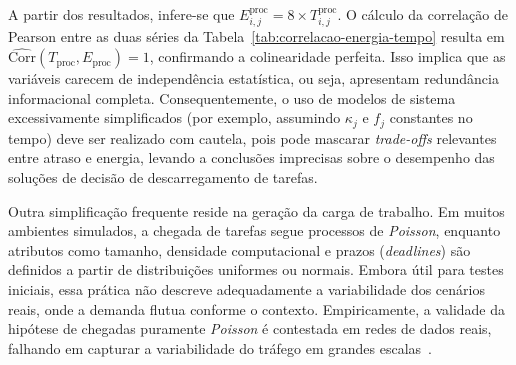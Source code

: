 \begin{figure}[ht!]
    \centering
\end{figure}

A partir dos resultados, infere-se que $E_{i,j}^{\text{proc}} = 8 \times T_{i,j}^{\text{proc}}$. O cálculo da correlação de Pearson entre as duas séries da Tabela~\ref{tab:correlacao-energia-tempo} resulta em $\widehat{\mathrm{Corr}}(T_{\text{proc}}, E_{\text{proc}})=1$, confirmando a colinearidade perfeita. Isso implica que as variáveis carecem de independência estatística, ou seja, apresentam redundância informacional completa. Consequentemente, o uso de modelos de sistema excessivamente simplificados (por exemplo, assumindo $\kappa_j$ e $f_j$ constantes no tempo) deve ser realizado com cautela, pois pode mascarar \textit{trade-offs} relevantes entre atraso e energia, levando a conclusões imprecisas sobre o desempenho das soluções de decisão de descarregamento de tarefas.

Outra simplificação frequente reside na geração da carga de trabalho. Em muitos ambientes simulados, a chegada de tarefas segue processos de \textit{Poisson}, enquanto atributos como tamanho, densidade computacional e prazos (\textit{deadlines}) são definidos a partir de distribuições uniformes ou normais. Embora útil para testes iniciais, essa prática não descreve adequadamente a variabilidade dos cenários reais, onde a demanda flutua conforme o contexto. Empiricamente, a validade da hipótese de chegadas puramente \textit{Poisson} é contestada em redes de dados reais, falhando em capturar a variabilidade do tráfego em grandes escalas~\cite{paxson1995wide}. 

